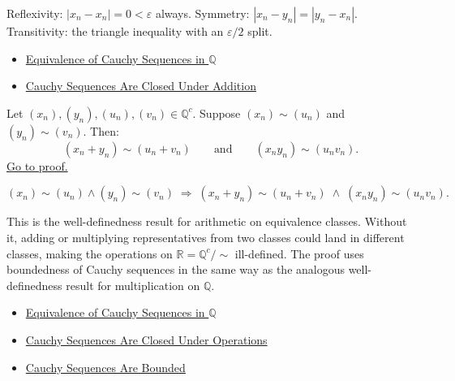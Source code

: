 \begin{remark*}[Interpretation]
Reflexivity: $|x_n - x_n| = 0 < \varepsilon$ always.
Symmetry: $|x_n - y_n| = |y_n - x_n|$.
Transitivity: the triangle inequality with an $\varepsilon/2$ split.
\end{remark*}

\begin{dependencies}
\begin{itemize}
  \item \hyperref[def:cauchy-equivalence]{Equivalence of Cauchy Sequences in $\mathbb{Q}$}
  \item \hyperref[thm:cauchy-closed-operations-q]{Cauchy Sequences Are Closed Under Addition}
\end{itemize}
\end{dependencies}

\begin{theorem}
\label{thm:cauchy-equiv-preserved-operations}
Let $(x_n),(y_n),(u_n),(v_n) \in \mathbb{Q}^c$.
Suppose $(x_n) \sim (u_n)$ and $(y_n) \sim (v_n)$.  Then:
\[
(x_n + y_n) \sim (u_n + v_n)
\qquad\text{and}\qquad
(x_n y_n) \sim (u_n v_n).
\]
\hyperref[prf:cauchy-equiv-preserved-operations]{Go to proof.}
\end{theorem}

\begin{remark*}
\[
(x_n) \sim (u_n) \land (y_n) \sim (v_n)
\;\Longrightarrow\;
(x_n + y_n) \sim (u_n + v_n)
\;\land\;
(x_n y_n) \sim (u_n v_n).
\]
\end{remark*}

\begin{remark*}[Interpretation]
This is the well-definedness result for arithmetic on equivalence classes.
Without it, adding or multiplying representatives from two classes could
land in different classes, making the operations on $\mathbb{R} = \mathbb{Q}^c/\!\sim$
ill-defined. The proof uses boundedness of Cauchy sequences in the same
way as the analogous well-definedness result for multiplication on $\mathbb{Q}$.
\end{remark*}

\begin{dependencies}
\begin{itemize}
  \item \hyperref[def:cauchy-equivalence]{Equivalence of Cauchy Sequences in $\mathbb{Q}$}
  \item \hyperref[thm:cauchy-closed-operations-q]{Cauchy Sequences Are Closed Under Operations}
  \item \hyperref[thm:cauchy-bounded-q]{Cauchy Sequences Are Bounded}
\end{itemize}
\end{dependencies}


